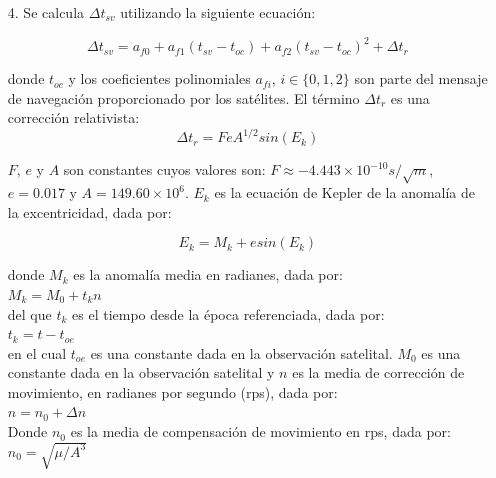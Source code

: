 {\begin{itemize}
donde $c$ es la velocidad de la luz: $c \approx 2.998 \times 10^{8} ms^{-1}$.

\item[4.] Se calcula $\Delta t_{sv}$ utilizando la siguiente ecuación:

\begin{equation}
\label{Eq:Deltat_sv}
\Delta t_{sv}= a_{f0} + a_{f1}(t_{sv}-t_{oc}) + a_{f2}(t_{sv}-t_{oc})^2 + \Delta t_{r}
\end{equation}

donde $t_{oc}$ y los coeficientes polinomiales $a_{fi}$, $i \in \lbrace0, 1, 2\rbrace$ son parte del mensaje de navegación proporcionado por los satélites. El término $\Delta t_{r}$ es una corrección relativista:\\

\begin{equation}
\label{Eq:Deltat_r}
\Delta t_r = FeA^{1/2}sin(E_{k})
\end{equation}

$F$, $e$ y $A$ son constantes cuyos valores son: $F \approx -4.443 \times 10^{-10} s/\sqrt{m}$, $e = 0.017$ y $A = 149.60 \times 10^{6}$. $E_{k}$ es la ecuación de Kepler de la anomalía de la excentricidad, dada por:

\begin{equation}
\label{Eq:Kepler}
E_k = M_k + esin(E_k)
\end{equation}

donde $M_k$ es la anomalía media en radianes, dada por: \\

$M_k = M_0 + t_k n$\\

del que $t_k$ es el tiempo desde la época referenciada, dada por:\\

$t_k = t - t_{oe}$\\

en el cual $t_{oe}$ es una constante dada en la observación satelital. $M_0$ es una constante dada en la observación satelital y $n$ es la media de corrección de movimiento, en radianes por segundo (rps), dada por:\\

$n = n_0 + \Delta n$\\

Donde $n_0$ es la media de compensación de movimiento en rps, dada por:\\

$n_0 = \sqrt{\mu / A^{3}}$\\ 


\end{itemize}}
